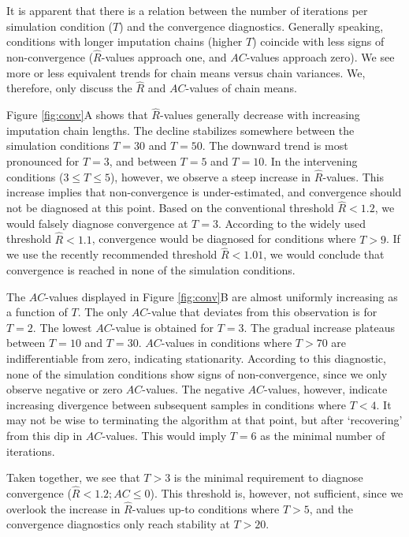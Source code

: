 \documentclass[article]{jss}
\begin{document}
It is apparent that there is a relation between the number of iterations per simulation condition ($T$) and the convergence diagnostics. Generally speaking, conditions with longer imputation chains (higher $T$) coincide with less signs of non-convergence ($\widehat{R}$-values approach one, and $AC$-values approach zero). We see more or less equivalent trends for chain means versus chain variances. We, therefore, only discuss the $\widehat{R}$ and $AC$-values of chain means. 

Figure \ref{fig:conv}A shows that $\widehat{R}$-values generally decrease with increasing imputation chain lengths. The decline stabilizes somewhere between the simulation conditions $T=30$ and $T=50$. The downward trend is most pronounced for $T=3$, and between $T = 5$ and $T = 10$. In the intervening conditions ($3 \leq T \leq 5$), however, we observe a steep increase in $\widehat{R}$-values. This increase implies that non-convergence is under-estimated, and convergence should not be diagnosed at this point. Based on the conventional threshold $\widehat{R} < 1.2$, we would falsely diagnose convergence at $T=3$. According to the widely used threshold $\widehat{R} < 1.1$, convergence would be diagnosed for conditions where $T>9$. If we use the recently recommended threshold $\widehat{R} < 1.01$, we would conclude that convergence is reached in none of the simulation conditions. 

The $AC$-values displayed in Figure \ref{fig:conv}B are almost uniformly increasing as a function of $T$. The only $AC$-value that deviates from this observation is for $T=2$. The lowest $AC$-value is obtained for $T=3$. %
The gradual increase plateaus between $T=10$ and $T=30$. $AC$-values in conditions where $T>70$ are indifferentiable from zero, indicating stationarity. %
According to this diagnostic, none of the simulation conditions show signs of non-convergence, since we only observe negative or zero $AC$-values. The negative $AC$-values, however, indicate increasing divergence between subsequent samples in conditions where $T<4$. It may not be wise to terminating the algorithm at that point, but after `recovering' from this dip in $AC$-values. This would imply $T=6$ as the minimal number of iterations. 

Taken together, we see that $T>3$ is the minimal requirement to diagnose convergence ($\widehat{R} < 1.2; AC \leq 0$). This threshold is, however, not sufficient, since we overlook the increase in $\widehat{R}$-values up-to conditions where $T>5$, and the convergence diagnostics only reach stability at $T>20$. 
\end{document}

